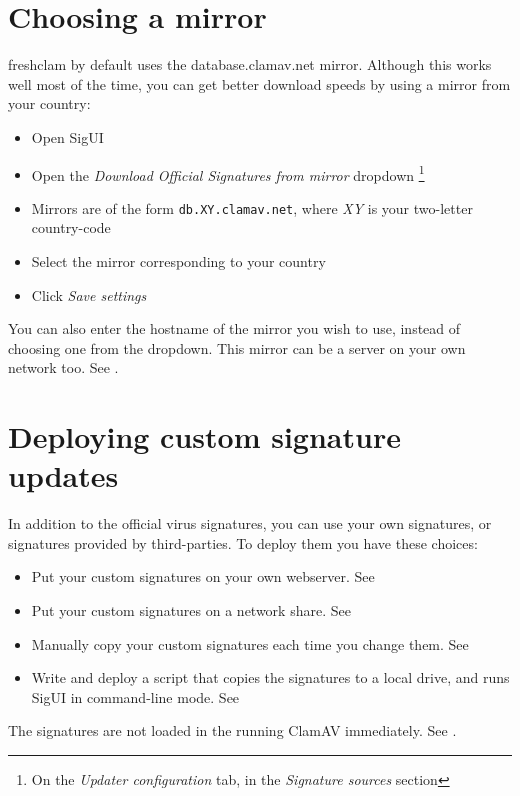 \section{Choosing a mirror}
\Gls{freshclam} by default uses the \gls{database.clamav.net} \gls{mirror}. Although this works well most of the time, you can get better download speeds by using a mirror from your country:
\begin{itemize}
\item Open SigUI
\item Open the \emph{Download Official Signatures from mirror} dropdown \footnote{
On the \emph{Updater configuration} tab, in the \emph{Signature sources} section}
\item Mirrors are of the form \texttt{db.XY.clamav.net}, where \emph{XY} is your two-letter country-code
\item Select the mirror corresponding to your country
\item Click \emph{Save settings}
\end{itemize}

You can also enter the \gls{hostname} of the mirror you wish to use, instead of choosing one from the dropdown. 
This mirror can be a server on your own network too. See .

\section{Deploying custom signature updates}
In addition to the official virus signatures, you can use your own signatures, or signatures provided by third-parties.
To deploy them you have these choices:
\begin{itemize}
 \item Put your custom signatures on your own webserver. See 
 \item Put your custom signatures on a network share. See 
 \item Manually copy your custom signatures each time you change them. See 
 \item Write and deploy a script that copies the signatures to a local drive, and runs SigUI in command-line mode. See 
\end{itemize}

The signatures are not loaded in the running ClamAV immediately. See .



